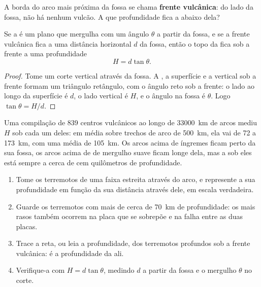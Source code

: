 A borda do arco mais próxima da fossa se chama \textbf{frente vulcânica}: do
lado da fossa, não há nenhum vulcão. A que profundidade fica a  abaixo
dela?

\begin{proposition}\label{prop:g12:subduction-magmatism:depth}
Se a  é um plano que mergulha com um ângulo $\theta$ a partir da fossa,
e se a frente vulcânica fica a uma distância horizontal $d$ da fossa, então
o topo da  fica sob a frente a uma profundidade
\[
  H = d \tan\theta .
\]
\end{proposition}

\begin{proof}
Tome um corte vertical através da fossa. A , a superfície e a vertical
sob a frente formam um triângulo retângulo, com o ângulo reto sob a frente:
o lado ao longo da superfície é $d$, o lado vertical é $H$, e o ângulo na
fossa é $\theta$. Logo $\tan\theta = H/d$.
\end{proof}

Uma compilação de 839 centros vulcânicos ao longo de \qty{33000}{km} de
arcos mediu $H$ sob cada um deles: em média sobre trechos de arco de
\qty{500}{km}, ela vai de 72 a \qty{173}{km}, com uma média de
\qty{105}{km}. Os arcos acima de  íngremes ficam perto da sua fossa,
os arcos acima de  de mergulho suave ficam longe dela, mas a  sob
eles está sempre a cerca de cem quilômetros de profundidade.

\begin{method}\label{met:g12:subduction-magmatism:slab}
\begin{enumerate}
  \item Tome os terremotos de uma faixa estreita através do arco, e
        represente a sua profundidade em função da sua distância através
        dele, em escala verdadeira.
  \item Guarde os terremotos com mais de cerca de \qty{70}{km} de
        profundidade: os mais rasos também ocorrem na placa que se sobrepõe e
        na falha entre as duas placas.
  \item Trace a reta, ou leia a profundidade, dos terremotos profundos sob a
        frente vulcânica: é a profundidade da  ali.
  \item Verifique-a com $H = d\tan\theta$, medindo $d$ a partir da fossa e
        o mergulho $\theta$ no corte.
\end{enumerate}
\end{method}

